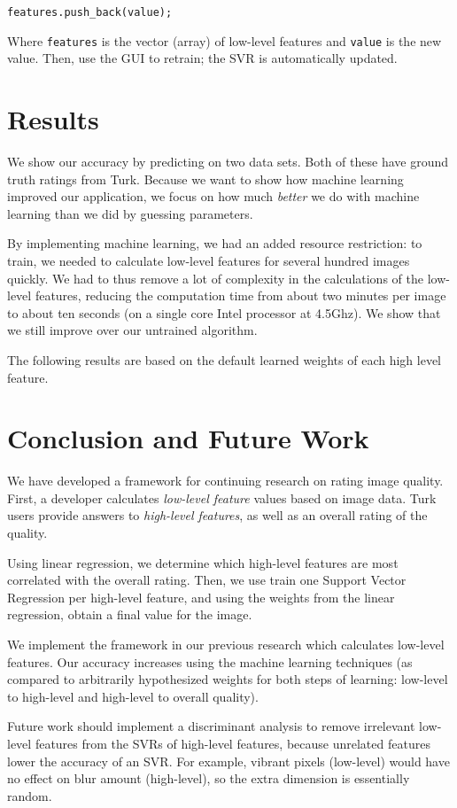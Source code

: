 \documentclass[11pt,letter]{article}
\begin{document}
\texttt{features.push\_back(value);}

Where \texttt{features} is the vector (array) of low-level features and \texttt{value} is the new value. Then, use the GUI to retrain; the SVR is automatically updated.

\section{Results}
We show our accuracy by predicting on two data sets. Both of these have ground truth ratings from Turk. Because we want to show how machine learning improved our application, we focus on how much \textit{better} we do with machine learning than we did by guessing parameters.

By implementing machine learning, we had an added resource restriction: to train, we needed to calculate low-level features for several hundred images quickly. We had to thus remove a lot of complexity in the calculations of the low-level features, reducing the computation time from about two minutes per image to about ten seconds (on a single core Intel processor at 4.5Ghz). We show that we still improve over our untrained algorithm.

The following results are based on the default learned weights of each high level feature.

\section{Conclusion and Future Work}
We have developed a framework for continuing research on rating image quality. First, a developer calculates \textit{low-level feature} values based on image data. Turk users provide answers to \textit{high-level features}, as well as an overall rating of the quality.

Using linear regression, we determine which high-level features are most correlated with the overall rating. Then, we use train one Support Vector Regression per high-level feature, and using the weights from the linear regression, obtain a final value for the image.

We implement the framework in our previous research which calculates low-level features. Our accuracy increases using the machine learning techniques (as compared to arbitrarily hypothesized weights for both steps of learning: low-level to high-level and high-level to overall quality).

Future work should implement a discriminant analysis to remove irrelevant low-level features from the SVRs of high-level features, because unrelated features lower the accuracy of an SVR. For example, vibrant pixels (low-level) would have no effect on blur amount (high-level), so the extra dimension is essentially random.
\end{document}
